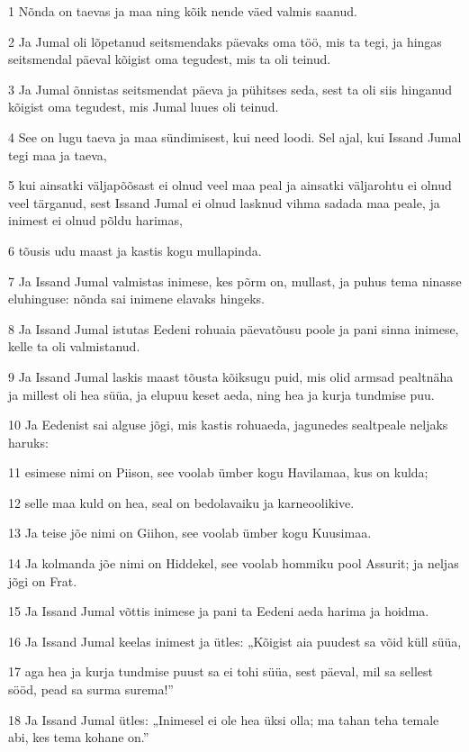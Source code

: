\par 1 Nõnda on taevas ja maa ning kõik nende väed valmis saanud.
\par 2 Ja Jumal oli lõpetanud seitsmendaks päevaks oma töö, mis ta tegi, ja hingas seitsmendal päeval kõigist oma tegudest, mis ta oli teinud.
\par 3 Ja Jumal õnnistas seitsmendat päeva ja pühitses seda, sest ta oli siis hinganud kõigist oma tegudest, mis Jumal luues oli teinud.
\par 4 See on lugu taeva ja maa sündimisest, kui need loodi. Sel ajal, kui Issand Jumal tegi maa ja taeva,
\par 5 kui ainsatki väljapõõsast ei olnud veel maa peal ja ainsatki väljarohtu ei olnud veel tärganud, sest Issand Jumal ei olnud lasknud vihma sadada maa peale, ja inimest ei olnud põldu harimas,
\par 6 tõusis udu maast ja kastis kogu mullapinda.
\par 7 Ja Issand Jumal valmistas inimese, kes põrm on, mullast, ja puhus tema ninasse eluhinguse: nõnda sai inimene elavaks hingeks.
\par 8 Ja Issand Jumal istutas Eedeni rohuaia päevatõusu poole ja pani sinna inimese, kelle ta oli valmistanud.
\par 9 Ja Issand Jumal laskis maast tõusta kõiksugu puid, mis olid armsad pealtnäha ja millest oli hea süüa, ja elupuu keset aeda, ning hea ja kurja tundmise puu.
\par 10 Ja Eedenist sai alguse jõgi, mis kastis rohuaeda, jagunedes sealtpeale neljaks haruks:
\par 11 esimese nimi on Piison, see voolab ümber kogu Havilamaa, kus on kulda;
\par 12 selle maa kuld on hea, seal on bedolavaiku ja karneoolikive.
\par 13 Ja teise jõe nimi on Giihon, see voolab ümber kogu Kuusimaa.
\par 14 Ja kolmanda jõe nimi on Hiddekel, see voolab hommiku pool Assurit; ja neljas jõgi on Frat.
\par 15 Ja Issand Jumal võttis inimese ja pani ta Eedeni aeda harima ja hoidma.
\par 16 Ja Issand Jumal keelas inimest ja ütles: „Kõigist aia puudest sa võid küll süüa,
\par 17 aga hea ja kurja tundmise puust sa ei tohi süüa, sest päeval, mil sa sellest sööd, pead sa surma surema!”
\par 18 Ja Issand Jumal ütles: „Inimesel ei ole hea üksi olla; ma tahan teha temale abi, kes tema kohane on.”
